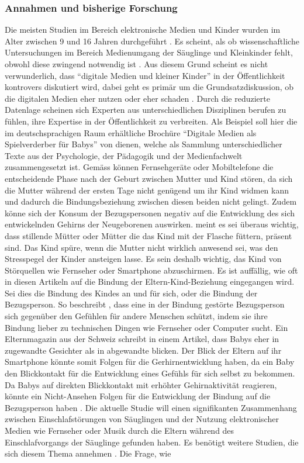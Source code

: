 \subsubsection{Annahmen und bisherige Forschung}
Die meisten Studien im Bereich elektronische Medien und Kinder wurden im Alter zwischen 9 und 16 Jahren durchgeführt \cite{Chaudron2015}. Es scheint, als ob wissenschaftliche Untersuchungen im Bereich Medienumgang der Säuglinge und Kleinkinder fehlt, obwohl diese zwingend notwendig ist \cite{Olafsson2014, Konitzer2017}. Aus diesem Grund scheint es nicht verwunderlich, dass \enquote{digitale Medien und kleiner Kinder} in der Öffentlichkeit kontrovers diskutiert wird, dabei geht es primär um die Grundsatzdiskussion, ob die digitalen Medien eher nutzen oder eher schaden \cite{Divsi2015}. Durch die reduzierte Datenlage scheinen sich Experten aus unterschiedlichen Disziplinen berufen zu fühlen, ihre Expertise in der Öffentlichkeit zu verbreiten. Als Beispiel soll hier die im deutschsprachigen Raum erhältliche Brochüre \enquote{Digitale Medien als Spielverderber für Babys} von  dienen, welche als Sammlung unterschiedlicher Texte aus der Psychologie, der Pädagogik und der Medienfachwelt zusammengesetzt ist. Gemäss  können Fernsehgeräte oder Mobiltelefone die entscheidende Phase nach der Geburt zwischen Mutter und Kind stören, da sich die Mutter während der ersten Tage nicht genügend um ihr Kind widmen kann und dadurch die Bindungsbeziehung zwischen diesen beiden nicht gelingt. Zudem könne sich der Konsum der Bezugspersonen negativ auf die Entwicklung des sich entwickelnden Gehirns der Neugeborenen auswirken.  meint es sei überaus wichtig, dass stillende Mütter oder Mütter die das Kind mit der Flasche füttern, präsent sind. Das Kind spüre, wenn die Mutter nicht wirklich anwesend sei, was den Stresspegel der Kinder ansteigen lasse. Es sein deshalb wichtig, das Kind von Störquellen wie Fernseher oder Smartphone abzuschirmen. Es ist auffällig, wie oft in diesen Artikeln auf die Bindung der Eltern-Kind-Beziehung eingegangen wird. Sei dies die Bindung des Kindes an und für sich, oder die Bindung der Bezugsperson. So beschreibt , dass eine in der Bindung gestörte Bezugsperson sich gegenüber den Gefühlen für andere Menschen schützt, indem sie ihre Bindung lieber zu technischen Dingen wie Fernseher oder Computer sucht. Ein Elternmagazin aus der Schweiz schreibt in einem Artikel, dass Babys eher in zugewandte Gesichter als in abgewandte blicken. Der Blick der Eltern auf ihr Smartphone könnte somit Folgen für die Gerhirnentwicklung haben, da ein Baby den Blickkontakt für die Entwicklung eines Gefühls für sich selbst zu bekommen. Da Babys auf direkten Blickkontakt mit erhöhter Gehirnaktivität reagieren, könnte ein Nicht-Ansehen Folgen für die Entwicklung der Bindung auf die Bezugsperson haben \cite{Weber2017}. Die aktuelle Studie  will einen signifikanten Zusammenhang zwischen Einschlafstörungen von Säuglingen und der Nutzung elektronischer Medien wie Fernseher oder Musik durch die Eltern während des Einschlafvorgangs der Säuglinge gefunden haben. Es benötigt weitere Studien, die sich diesem Thema annehmen \cite{Wartella2016}. Die Frage, wie 